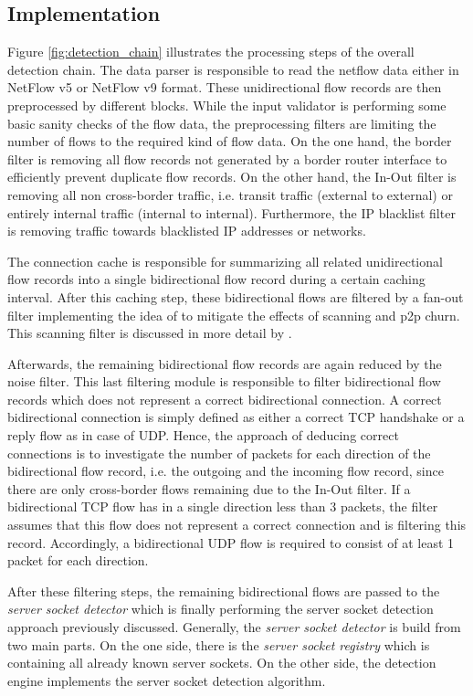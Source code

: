 \subsection{Implementation}
Figure \ref{fig:detection_chain} illustrates the processing steps of the
overall detection chain. The data parser is responsible to read the netflow data
either in NetFlow v5 or NetFlow v9 format. These unidirectional flow records are
then preprocessed by different blocks. While the input validator is performing
some basic sanity checks of the flow data, the preprocessing filters are
limiting the number of flows to the required kind of flow data. On the one hand,
the border filter is removing all flow records not generated by a border router
interface to efficiently prevent duplicate flow records. On the other hand, the
In-Out filter is removing all non cross-border traffic, i.e. transit traffic
(external to external) or entirely internal traffic (internal to internal).
Furthermore, the IP blacklist filter is removing traffic towards blacklisted IP
addresses or networks.

The connection cache is responsible for summarizing all related unidirectional
flow records into a single bidirectional flow record during a certain caching
interval. After this caching step, these bidirectional flows are filtered by a
fan-out filter implementing the idea of \citet{Allman:2007} to mitigate the
effects of scanning and \gls{p2p} churn. This scanning filter is discussed in
more detail by \citet{Schatzmann:Mining,Schatzmann:Dissection,
Schatzmann:Tracing}.

Afterwards, the remaining bidirectional flow records are again reduced by the
noise filter. This last filtering module is responsible to filter bidirectional
flow records which does not represent a correct bidirectional connection. A
correct bidirectional connection is simply defined as either a correct \gls{TCP}
handshake or a reply flow as in case of \gls{UDP}.
Hence, the approach of deducing correct connections is to investigate the number
of packets for each direction of the bidirectional flow record, i.e. the
outgoing and the incoming flow record, since there are only cross-border flows
remaining due to the In-Out filter.
If a bidirectional \gls{TCP} flow has in a single direction less than 3
packets, the filter assumes that this flow does not represent a correct
connection and is filtering this record. Accordingly, a bidirectional \gls{UDP}
flow is required to consist of at least 1 packet for each direction.

After these filtering steps, the remaining bidirectional flows are passed to the
\emph{server socket detector} which is finally performing the
\gls{server socket} detection approach previously discussed. Generally, the
\emph{server socket detector} is build from two main parts.
On the one side, there is the \emph{server socket registry} which is
containing all already known \glspl{server socket}. On the other side, the
detection engine implements the \gls{server socket} detection algorithm.

